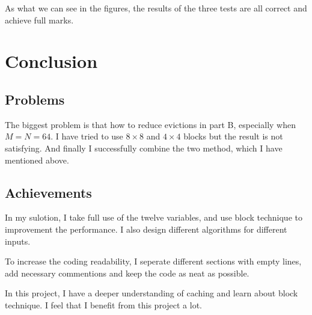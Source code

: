 \documentclass{article}
\begin{document}
As what we can see in the figures, the results of the three tests are all correct and achieve full marks.

\section{Conclusion}

\subsection{Problems}

The biggest problem is that how to reduce evictions in part B, especially when $M = N = 64$. I have tried to use $8 \times 8$ and $4 \times 4$ blocks but the result is not satisfying. And finally I successfully combine the two method, which I have mentioned above. 

\subsection{Achievements}

In my sulotion, I take full use of the twelve variables, and use block technique to improvement the performance. I also design different algorithms for different inputs.

To increase the coding readability, I seperate different sections with empty lines, add necessary commentions and keep the code as neat as possible.

In this project, I have a deeper understanding of caching and learn about block technique. I feel that I benefit from this project a lot.

\end{document}
